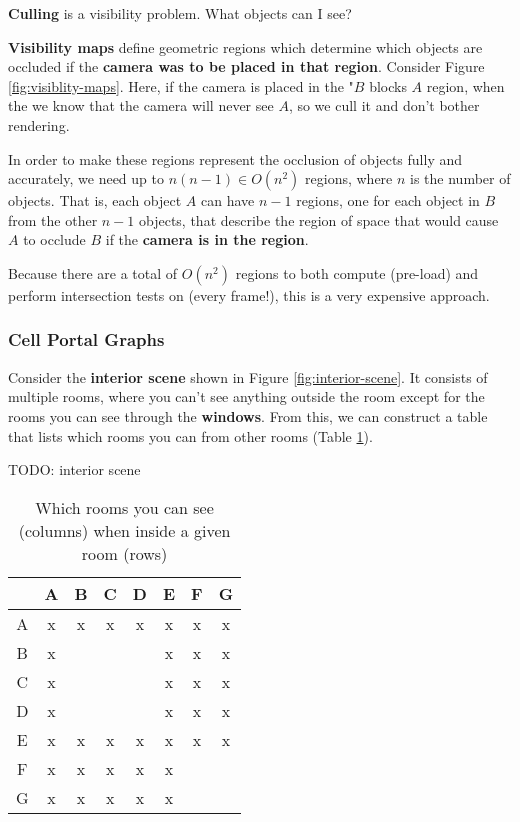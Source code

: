 \documentclass{article}
\begin{document}
\textbf{Culling} is a visibility problem. What objects can I see? 

\textbf{Visibility maps} define geometric regions which determine which objects are occluded if the \textbf{camera was to be placed in that region}. Consider Figure \ref{fig:visiblity-maps}. Here, if the camera is placed in the "$B$ blocks $A$ region, when the we know that the camera will never see $A$, so we cull it and don't bother rendering.

In order to make these regions represent the occlusion of objects fully and accurately, we need up to $n(n-1) \in O(n^2)$ regions, where $n$ is the number of objects. That is, each object $A$ can have $n - 1$ regions, one for each object in $B$ from the other $n - 1$ objects, that describe the region of space that would cause $A$ to occlude $B$ if the \textbf{camera is in the region}.

Because there are a total of $O(n^2)$ regions to both compute (pre-load) and perform intersection tests on (every frame!), this is a very expensive approach.

\subsubsection{Cell Portal Graphs}

Consider the \textbf{interior scene} shown in Figure \ref{fig:interior-scene}. It consists of multiple rooms, where you can't see anything outside the room except for the rooms you can see through the \textbf{windows}. From this, we can construct a table that lists which rooms you can from other rooms (Table \ref{tab:cell-portal-graph}).

TODO: interior scene 

\begin{table}
	\centering
	\begin{tabular}{|c|c|c|c|c|c|c|c|}
		\hline
		& A & B & C & D & E & F & G \\
		\hline
		A & x & x & x & x & x & x & x \\
		B & x & & & & x & x & x \\
		C & x & & & & x & x & x \\
		D & x & & & & x & x & x \\
		E & x & x & x & x & x & x & x \\
		F & x & x & x & x & x & & \\						
		G & x & x & x & x & x & & \\		
		\hline
	\end{tabular}
	\caption{Which rooms you can see (columns) when inside a given room (rows)}
	\label{tab:cell-portal-graph}
\end{table}
\end{document}
